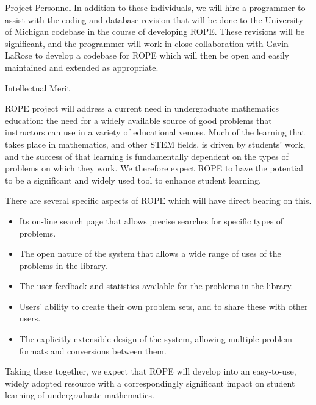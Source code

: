 \documentclass[11pt]{article}
\begin{document}
\begin{section}{Project Personnel}
In addition to these individuals, we will hire a programmer to assist with
the coding and database revision that will be done to the University of
Michigan codebase in the course of developing ROPE. These revisions
will be significant, and the programmer will work in close collaboration
with Gavin LaRose to develop a codebase for ROPE which will then be
open and easily maintained and extended as appropriate. 

\end{section}

\begin{section}{Intellectual Merit}

ROPE project will address a current need in undergraduate mathematics
education: the need for a widely available source of good problems that
instructors can use in a variety of educational venues.  Much of the
learning that takes place in mathematics, and other STEM fields, is driven
by students' work, and the success of that learning is fundamentally
dependent on the types of problems on which they work.  We therefore
expect ROPE to have the potential to be a significant and widely used
tool to enhance student learning.  

There are several specific aspects of ROPE which will have direct
bearing on this.
\begin{itemize}
  \item
    Its on-line search page that allows precise searches for specific
    types of problems.
  \item
    The open nature of the system that allows a wide range of uses of the
    problems in the library.
  \item
    The user feedback and statistics available for the problems in the
    library. 
  \item
    Users' ability to create their own problem sets, and to share
    these with other users.
  \item
    The explicitly extensible design of the system, allowing multiple
    problem formats and conversions between them.
\end{itemize}

Taking these together, we expect that ROPE will develop into an
easy-to-use, widely adopted resource with a correspondingly significant
impact on student learning of undergraduate mathematics.

\end{section}
\end{document}
